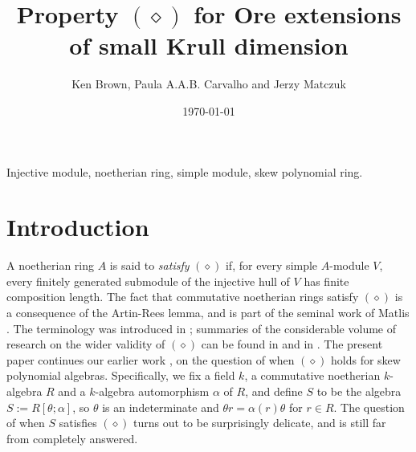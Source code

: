 \documentclass[a4paper, 11pt]{article}
\theoremstyle{definition}
\begin{document}
\title{Property $(\diamond)$ for Ore extensions of small Krull dimension}
\author{Ken Brown, Paula A.A.B. Carvalho and Jerzy Matczuk}
\date{\today}
\maketitle




 Injective module, noetherian ring, simple module, skew polynomial ring.




\section{Introduction}\label{intro}  A noetherian ring $A$ is said to {\it satisfy}  $(\diamond)$ if, for every simple $A$-module $V$, every finitely generated submodule of the injective hull of $V$ has finite composition length. The fact that commutative noetherian rings satisfy $(\diamond)$ is a consequence of the Artin-Rees lemma, and is part of the seminal work of Matlis  \cite{M}. The terminology was introduced in \cite{PaulaChristianDilek}; summaries of the considerable volume of research on the wider validity of $(\diamond)$  can be found in \cite{Ian} and in \cite{BCM}. The present paper continues our earlier work \cite{BCM}, \cite{BCM2} on the question of when $(\diamond)$ holds for skew polynomial algebras. Specifically, we fix a field $k$, a commutative noetherian $k$-algebra $R$ and a $k$-algebra automorphism $\alpha$ of $R$, and define $S$ to be the algebra $S := R[\theta ; \alpha]$, so $\theta$ is an indeterminate and $\theta r = \alpha(r)\theta$ for $r \in R$. The question of when $S$ satisfies $(\diamond)$ turns out to be surprisingly delicate, and is still far from completely answered.
\end{document}
